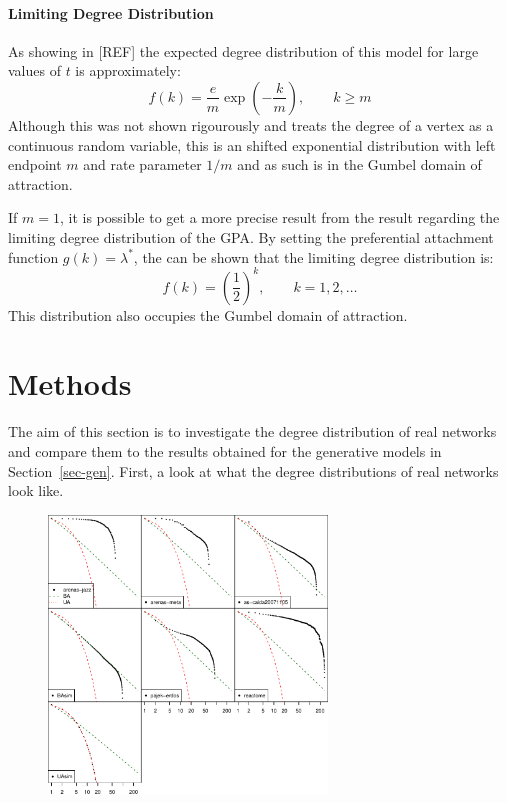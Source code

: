 \documentclass[
  10pt,
  a4paper,
]{scrreprt}
\theoremstyle{plain}
\theoremstyle{plain}
\theoremstyle{definition}
\theoremstyle{plain}
\theoremstyle{remark}
\begin{document}
{\hypertarget{limiting-degree-distribution-1}{%
\subsubsection{Limiting Degree
Distribution}\label{limiting-degree-distribution-1}}

As showing in {[}REF{]} the expected degree distribution of this model
for large values of \(t\) is approximately: \[
f(k) = \displaystyle\frac{e}{m}\exp\left(-\displaystyle\frac{k}{m}\right),\qquad k \ge m
\] Although this was not shown rigourously and treats the degree of a
vertex as a continuous random variable, this is an shifted exponential
distribution with left endpoint \(m\) and rate parameter \(1/m\) and as
such is in the Gumbel domain of attraction.

If \(m=1\), it is possible to get a more precise result from the result
regarding the limiting degree distribution of the GPA. By setting the
preferential attachment function \(g(k) = \lambda^*\), the can be shown
that the limiting degree distribution is: \[
f(k) = \left(\frac{1}{2} \right)^{k}, \qquad k=1,2,\ldots 
\] This distribution also occupies the Gumbel domain of attraction.

\hypertarget{sec-meth}{%
\chapter{Methods}\label{sec-meth}}

The aim of this section is to investigate the degree distribution of
real networks and compare them to the results obtained for the
generative models in Section~\ref{sec-gen}. First, a look at what the
degree distributions of real networks look like.

\begin{figure}[H]

{\centering \includegraphics[width=0.66\textwidth,height=\textheight]{doc_files/figure-pdf/fig-survs-1.pdf}

}
\end{figure}}
\end{document}
